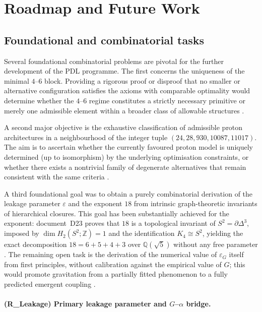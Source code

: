 \documentclass[11pt,a4paper]{article}
\begin{document}
\section{Roadmap and Future Work}
\label{sec:roadmap}

\subsection{Foundational and combinatorial tasks}
\label{subsec:roadmap_foundational}

Several foundational combinatorial problems are pivotal for the further development of the PDL programme. The first concerns the uniqueness of the minimal $4$–$6$ block. Providing a rigorous proof or disproof that no smaller or alternative configuration satisfies the axioms with comparable optimality would determine whether the $4$–$6$ regime constitutes a strictly necessary primitive or merely one admissible element within a broader class of allowable structures \citep{PDL_Main_2026,PDL_position}. 

A second major objective is the exhaustive classification of admissible proton architectures in a neighbourhood of the integer tuple $(24,28,930,10087,11017)$. The aim is to ascertain whether the currently favoured proton model is uniquely determined (up to isomorphism) by the underlying optimisation constraints, or whether there exists a nontrivial family of degenerate alternatives that remain consistent with the same criteria \citep{Combinatorial_Proton_v2_2026,PDL_position}. 

A third foundational goal was to obtain a purely combinatorial derivation of the leakage parameter $\varepsilon$ and the exponent $18$ from intrinsic graph-theoretic invariants of hierarchical closures. This goal has been substantially achieved for the exponent: document~D23 proves that $18$ is a topological invariant of $S^2 = \partial\Delta^3$, imposed by $\dim H_2(S^2;\mathbb{Z}) = 1$ and the identification $K_4 \cong S^2$, yielding the exact decomposition $18 = 6+5+4+3$ over $\mathbb{Q}(\sqrt{5})$ without any free parameter \citep{Topology_18_PDL_2026}. The remaining open task is the derivation of the numerical value of $\varepsilon_G$ itself from first principles, without calibration against the empirical value of $G$; this would promote gravitation from a partially fitted phenomenon to a fully predicted emergent coupling \citep{Exponent_18_PDL_2026,Coherence_Leakage_18_2026,PDL_position}.
\paragraph{(R\_Leakage) Primary leakage parameter and $G$--$\alpha$ bridge.}
\end{document}
